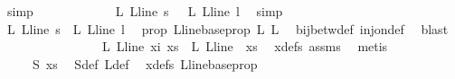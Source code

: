 \begin{isabellebody}
\ simp\isanewline
\ \ \ \ \ \ \ \ \isamarkupfalse%
\ \isamarkupfalse%
\ {\isachardoublequoteopen}{\isasymphi}\ {\isacharparenleft}{\kern0pt}{\isasymchi}L\ {\isacharparenleft}{\kern0pt}L{\isacharunderscore}{\kern0pt}line\ s{\isacharparenright}{\kern0pt}{\isacharparenright}{\kern0pt}\ {\isacharequal}{\kern0pt}\ {\isasymphi}\ {\isacharparenleft}{\kern0pt}{\isasymchi}L\ {\isacharparenleft}{\kern0pt}L{\isacharunderscore}{\kern0pt}line\ l{\isacharparenright}{\kern0pt}{\isacharparenright}{\kern0pt}{\isachardoublequoteclose}\ \isamarkupfalse%
\ simp\isanewline
\ \ \ \ \ \ \ \ \isamarkupfalse%
\ \isamarkupfalse%
\ {\isachardoublequoteopen}{\isasymchi}L\ {\isacharparenleft}{\kern0pt}L{\isacharunderscore}{\kern0pt}line\ s{\isacharparenright}{\kern0pt}\ {\isacharequal}{\kern0pt}\ {\isasymchi}L\ {\isacharparenleft}{\kern0pt}L{\isacharunderscore}{\kern0pt}line\ l{\isacharparenright}{\kern0pt}{\isachardoublequoteclose}\ \isamarkupfalse%
\ {\isasymphi}{\isacharunderscore}{\kern0pt}prop\ L{\isacharunderscore}{\kern0pt}line{\isacharunderscore}{\kern0pt}base{\isacharunderscore}{\kern0pt}prop\ L{}\ L{}\ \isamarkupfalse%
\ bij{\isacharunderscore}{\kern0pt}betw{\isacharunderscore}{\kern0pt}def\ inj{\isacharunderscore}{\kern0pt}on{\isacharunderscore}{\kern0pt}def\ \isamarkupfalse%
\ blast\isanewline
\ \ \ \ \ \ \isamarkupfalse%
\isanewline
\ \ \ \ \ \ \isamarkupfalse%
\ \isamarkupfalse%
\ {\isachardoublequoteopen}{\isasymchi}L\ {\isacharparenleft}{\kern0pt}L{\isacharunderscore}{\kern0pt}line\ xi{\isacharparenright}{\kern0pt}\ xs\ {\isacharequal}{\kern0pt}\ {\isasymchi}L\ {\isacharparenleft}{\kern0pt}L{\isacharunderscore}{\kern0pt}line\ {}{\isacharparenright}{\kern0pt}\ xs{\isachardoublequoteclose}\ \isamarkupfalse%
\ xdefs\ assms{\isacharparenleft}{\kern0pt}{}{\isacharparenright}{\kern0pt}\ \isamarkupfalse%
\ metis\isanewline
\ \ \ \ \ \ \isamarkupfalse%
\ \isamarkupfalse%
\ {\isachardoublequoteopen}\ {\isachardot}{\kern0pt}{\isachardot}{\kern0pt}{\isachardot}{\kern0pt}\ {\isacharequal}{\kern0pt}\ \ {\isasymchi}S\ xs{\isachardoublequoteclose}\ \isamarkupfalse%
\ {\isasymchi}S{\isacharunderscore}{\kern0pt}def\ {\isasymchi}L{\isacharunderscore}{\kern0pt}def\ \isamarkupfalse%
\ xdefs\ L{\isacharunderscore}{\kern0pt}line{\isacharunderscore}{\kern0pt}base{\isacharunderscore}{\kern0pt}prop\ \isamarkupfalse%

\end{isabellebody}
